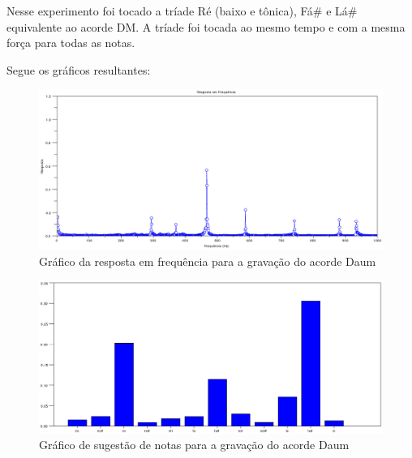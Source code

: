 Nesse experimento foi tocado a tríade Ré (baixo e tônica), Fá\# e Lá\# equivalente ao acorde DM. A tríade foi tocada ao mesmo tempo e com a mesma força para todas as notas.

Segue os gráficos resultantes:

\begin{figure}[h]
	\centering
		\includegraphics[keepaspectratio=true,scale=0.49]{figuras/Dm/fft_Daum.eps}
	\caption{Gráfico da resposta em frequência para a gravação do acorde Daum}
\end{figure}

\begin{figure}[h]
	\centering
		\includegraphics[keepaspectratio=true,scale=0.49]{figuras/Dm/notas_Daum.eps}
	\caption{Gráfico de sugestão de notas para a gravação do acorde Daum}
\end{figure}


